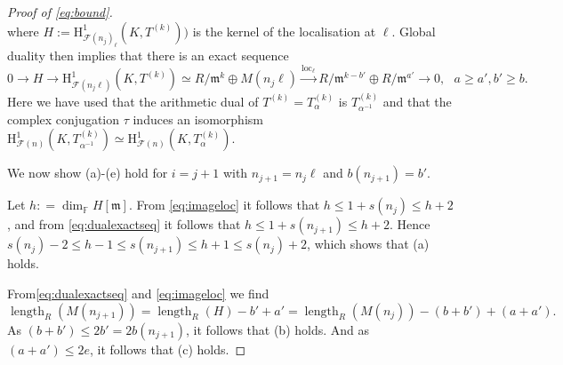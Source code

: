 \documentclass[a4paper,10pt]{amsart}
\numberwithin{equation}{section}
\numberwithin{equation}{section}
\theoremstyle{plain}
\theoremstyle{definition}
\theoremstyle{definition}
\theoremstyle{plain}
\theoremstyle{plain}
\theoremstyle{plain}
\theoremstyle{plain}
\DeclareMathOperator{\loc}{loc}
\DeclareMathOperator{\length}{length}
\newcommand{\CF}{\mathcal{F}}
\newcommand{\Fcal}{\mathcal{F}}
\newcommand{\fm}{\mathfrak{m}}
\newcommand{\rH}{\mathrm{H}}
\begin{document}
\begin{proof}[Proof of \eqref{eq:bound}]
\begin{equation}
\end{equation}
where $H :=\rH^1_{\Fcal(n_j)_{\ell}}(K,T^{(k)}))$ is the kernel of the localisation at $\ell$. 
Global duality then implies that there is an exact sequence
\begin{equation}\label{eq:dualexactseq}
0 \to H \to  \rH^1_{\Fcal(n_j\ell)}(K,T^{(k)})\simeq R/\fm^k \oplus M(n_j\ell)\xrightarrow{\loc_{\ell}} R/\fm^{k-b'}\oplus R/\fm^{a'}\to 0, \ \ \ a\geq a', b'\geq b.
\end{equation}
Here we have used that the arithmetic dual of $T^{(k)} = T^{(k)}_\alpha$ is $T^{(k)}_{\alpha^{-1}}$ and that the complex conjugation $\tau$ induces an isomorphism $\rH^1_{\CF(n)}(K,T^{(k)}_{\alpha^{-1}})\simeq \rH^1_{\CF(n)}(K,T^{(k)}_{\alpha})$.

We now show (a)-(e) hold for $i=j+1$ with $n_{j+1}=n_j\ell$ and $b(n_{j+1}) = b'$. 

Let $h: = \dim_{\mathbb{F}} H[\fm]$. From \eqref{eq:imageloc} it follows that $h \leq 1+s(n_j) \leq h+2$, and from \eqref{eq:dualexactseq} it follows that
$h\leq 1+s(n_{j+1})\leq h+2$. Hence $s(n_j) -2 \leq h-1 \leq s(n_{j+1}) \leq h+1 \leq s(n_j) +2$, which shows that (a) holds. 

From\eqref{eq:dualexactseq} and  \eqref{eq:imageloc}  we find
\[
\length_R(M(n_{j+1})) = \length_R(H) - b' + a' = \length_R(M(n_j)) - (b+b') + (a+a').
\]
As $(b+b') \leq 2b' = 2b(n_{j+1})$, it follows that (b) holds. And as $(a+a') \leq 2e$, it follows that (c) holds.
%
%


\end{proof}
\end{document}
